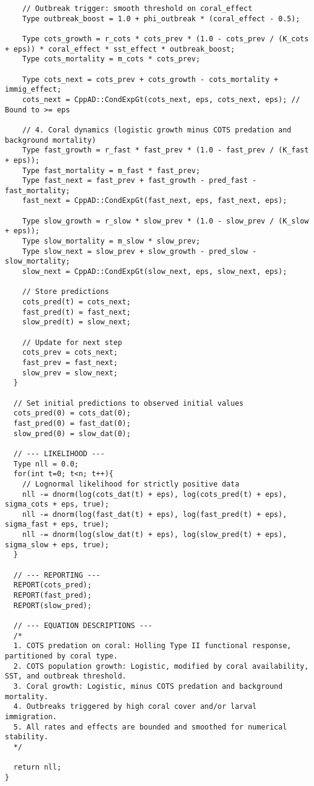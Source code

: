 \begin{lstlisting}
    // Outbreak trigger: smooth threshold on coral_effect
    Type outbreak_boost = 1.0 + phi_outbreak * (coral_effect - 0.5);

    Type cots_growth = r_cots * cots_prev * (1.0 - cots_prev / (K_cots + eps)) * coral_effect * sst_effect * outbreak_boost;
    Type cots_mortality = m_cots * cots_prev;

    Type cots_next = cots_prev + cots_growth - cots_mortality + immig_effect;
    cots_next = CppAD::CondExpGt(cots_next, eps, cots_next, eps); // Bound to >= eps

    // 4. Coral dynamics (logistic growth minus COTS predation and background mortality)
    Type fast_growth = r_fast * fast_prev * (1.0 - fast_prev / (K_fast + eps));
    Type fast_mortality = m_fast * fast_prev;
    Type fast_next = fast_prev + fast_growth - pred_fast - fast_mortality;
    fast_next = CppAD::CondExpGt(fast_next, eps, fast_next, eps);

    Type slow_growth = r_slow * slow_prev * (1.0 - slow_prev / (K_slow + eps));
    Type slow_mortality = m_slow * slow_prev;
    Type slow_next = slow_prev + slow_growth - pred_slow - slow_mortality;
    slow_next = CppAD::CondExpGt(slow_next, eps, slow_next, eps);

    // Store predictions
    cots_pred(t) = cots_next;
    fast_pred(t) = fast_next;
    slow_pred(t) = slow_next;

    // Update for next step
    cots_prev = cots_next;
    fast_prev = fast_next;
    slow_prev = slow_next;
  }

  // Set initial predictions to observed initial values
  cots_pred(0) = cots_dat(0);
  fast_pred(0) = fast_dat(0);
  slow_pred(0) = slow_dat(0);

  // --- LIKELIHOOD ---
  Type nll = 0.0;
  for(int t=0; t<n; t++){
    // Lognormal likelihood for strictly positive data
    nll -= dnorm(log(cots_dat(t) + eps), log(cots_pred(t) + eps), sigma_cots + eps, true);
    nll -= dnorm(log(fast_dat(t) + eps), log(fast_pred(t) + eps), sigma_fast + eps, true);
    nll -= dnorm(log(slow_dat(t) + eps), log(slow_pred(t) + eps), sigma_slow + eps, true);
  }

  // --- REPORTING ---
  REPORT(cots_pred);
  REPORT(fast_pred);
  REPORT(slow_pred);

  // --- EQUATION DESCRIPTIONS ---
  /*
  1. COTS predation on coral: Holling Type II functional response, partitioned by coral type.
  2. COTS population growth: Logistic, modified by coral availability, SST, and outbreak threshold.
  3. Coral growth: Logistic, minus COTS predation and background mortality.
  4. Outbreaks triggered by high coral cover and/or larval immigration.
  5. All rates and effects are bounded and smoothed for numerical stability.
  */

  return nll;
}
\end{lstlisting}

